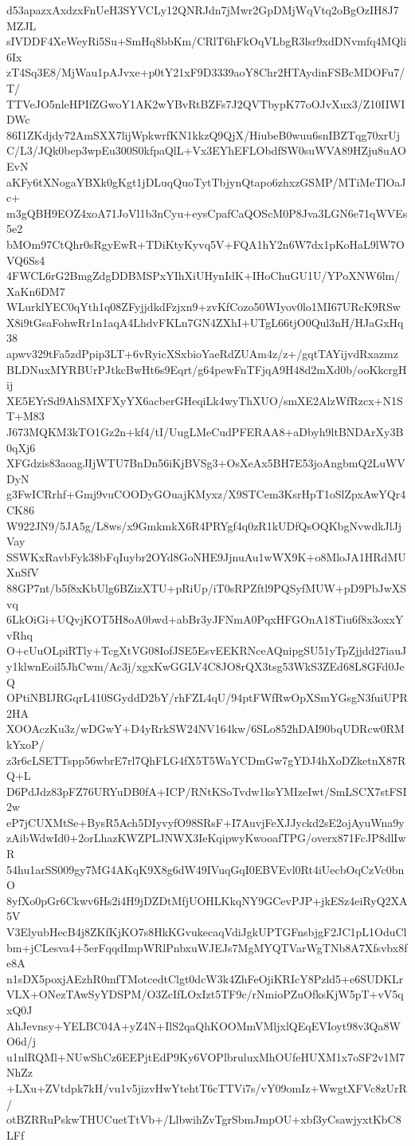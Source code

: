 d53apazxAxdzxFnUeH3SYVCLy12QNRJdn7jMwr2GpDMjWqVtq2oBgOzIH8J7MZJL
sIVDDF4XeWeyRi5Su+SmHq8bbKm/CRlT6hFkOqVLbgR3lsr9xdDNvmfq4MQli6Ix
zT4Sq3E8/MjWau1pAJvxe+p0tY21xF9D3339aoY8Chr2HTAydinFSBcMDOFu7/T/
TTVeJO5nleHPIfZGwoY1AK2wYBvRtBZFs7J2QVTbypK77oOJvXux3/Z10IIWIDWc
86I1ZKdjdy72AmSXX7lijWpkwrfKN1kkzQ9QjX/HiubeB0wuu6snIBZTqg70xrUj
C/L3/JQk0bep3wpEu300S0kfpaQlL+Vx3EYhEFLObdfSW0suWVA89HZju8uAOEvN
aKFy6tXNogaYBXk0gKgt1jDLuqQuoTytTbjynQtapo6zhxzGSMP/MTiMeTlOaJc+
m3gQBH9EOZ4xoA71JoVl1b3nCyu+eysCpafCaQOScM0P8Jva3LGN6e71qWVEs5e2
bMOm97CtQhr0sRgyEwR+TDiKtyKyvq5V+FQA1hY2n6W7dx1pKoHaL9lW7OVQ6Ss4
4FWCL6rG2BmgZdgDDBMSPxYIhXiUHynIdK+IHoChuGU1U/YPoXNW6lm/XaKn6DM7
WLurklYEC0qYth1q08ZFyjjdkdFzjxn9+zvKfCozo50WIyov0lo1MI67URcK9RSw
X8i9tGsaFohwRr1n1aqA4LhdvFKLn7GN4ZXhI+UTgL66tjO0Qul3nH/HJaGxHq38
apwv329tFa5zdPpip3LT+6vRyicXSxbioYaeRdZUAm4z/z+/gqtTAYijvdRxazmz
BLDNuxMYRBUrPJtkcBwHt6s9Eqrt/g64pewFnTFjqA9H48d2mXd0b/ooKkcrgHij
XE5EYrSd9AhSMXFXyYX6acberGHeqiLk4wyThXUO/smXE2AlzWfRzcx+N1ST+M83
J673MQKM3kTO1Gz2n+kf4/tI/UugLMeCudPFERAA8+aDbyh9ltBNDArXy3B0qXj6
XFGdzis83aoagJIjWTU7BnDn56iKjBVSg3+OsXeAx5BH7E53joAngbmQ2LuWVDyN
g3FwICRrhf+Gmj9vuCOODyGOuajKMyxz/X9STCem3KsrHpT1oSlZpxAwYQr4CK86
W922JN9/5JA5g/L8ws/x9GmkmkX6R4PRYgf4q0zR1kUDfQsOQKbgNvwdkJlJjVay
SSWKxRavbFyk38bFqIuybr2OYd8GoNHE9JjnuAu1wWX9K+o8MloJA1HRdMUXnSfV
88GP7nt/b5f8xKbUlg6BZizXTU+pRiUp/iT0sRPZftl9PQSyfMUW+pD9PbJwXSvq
6LkOiGi+UQvjKOT5H8oA0bwd+abBr3yJFNmA0PqxHFGOnA18Tiu6f8x3oxxYvRhq
O+cUuOLpiRTly+TcgXtVG08IofJSE5EsvEEKRNceAQnipgSU51yTpZjjdd27iauJ
y1klwnEoil5JhCwm/Ac3j/xgxKwGGLV4C8JO8rQX3tsg53WkS3ZEd68L8GFd0JeQ
OPtiNBIJRGqrL410SGyddD2bY/rhFZL4qU/94ptFWfRwOpXSmYGsgN3fuiUPR2HA
XOOAczKu3z/wDGwY+D4yRrkSW24NV164kw/6SLo852hDAI90bqUDRcw0RMkYxoP/
z3r6cLSETTspp56wbrE7rl7QhFLG4fX5T5WaYCDmGw7gYDJ4hXoDZketnX87RQ+L
D6PdJdz83pFZ76URYuDB0fA+ICP/RNtKSoTvdw1ksYMIzeIwt/SmLSCX7stFSI2w
eP7jCUXMtSe+BysR5Ach5DIyvyfO98SRsF+I7AuvjFeXJJyckd2sE2ojAyuWna9y
zAibWdwId0+2orLhazKWZPLJNWX3IeKqipwyKwooafTPG/overx871FcJP8dlIwR
54hu1arSS009gy7MG4AKqK9X8g6dW49IVuqGqI0EBVEvl0Rt4iUecbOqCzVc0bnO
8yfXo0pGr6Ckwv6Hs2i4H9jDZDtMfjUOHLKkqNY9GCevPJP+jkESz4eiRyQ2XA5V
V3ElyubHecB4j8ZKfKjKO7s8HkKGvukecaqVdiJgkUPTGFnsbjgF2JC1pL1OduCl
bm+jCLesva4+5erFqqdImpWRlPnbxuWJEJs7MgMYQTVarWgTNb8A7Xfsvbx8fe8A
n1sDX5poxjAEzhR0mfTMotcedtClgt0dcW3k4ZhFeOjiKRIcY8Pzld5+e6SUDKLr
VLX+ONezTAwSyYDSPM/O3ZcIfLOxIzt5TF9c/rNmioPZuOfksKjW5pT+vV5qxQ0J
AhJevnsy+YELBC04A+yZ4N+IlS2qaQhKOOMmVMljxlQEqEVIoyt98v3Qa8WO6d/j
u1nlRQMl+NUwShCz6EEPjtEdP9Ky6VOPlbruluxMhOUfeHUXM1x7oSF2v1M7NhZz
+LXu+ZVtdpk7kH/vu1v5jizvHwYtehtT6cTTVi7s/vY09omIz+WwgtXFVc8zUrR/
otBZRRuPskwTHUCuetTtVb+/LlbwihZvTgrSbmJmpOU+xbf3yCsawjyxtKbC8LFf
